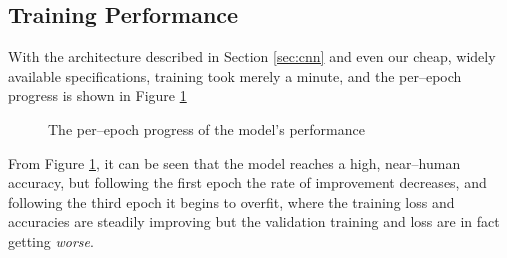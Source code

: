 \documentclass[conference]{IEEEtran}
\begin{document}
\subsection{Training Performance}
With the architecture described in Section \ref{sec:cnn} and even our cheap, widely available specifications, training took merely a minute, and the per--epoch progress is shown in Figure \ref{fig:perepoch}
\begin{figure}[!htp]
    \centering
    \scriptsize
    \caption{The per--epoch progress of the model's performance }\label{fig:perepoch}
\end{figure}
\par From Figure \ref{fig:perepoch}, it can be seen that the model reaches a high, near--human accuracy, but following the first epoch the rate of improvement decreases, and following the third epoch it begins to overfit, where the training loss and accuracies are steadily improving but the validation training and loss are in fact getting \textit{worse}.
\end{document}
